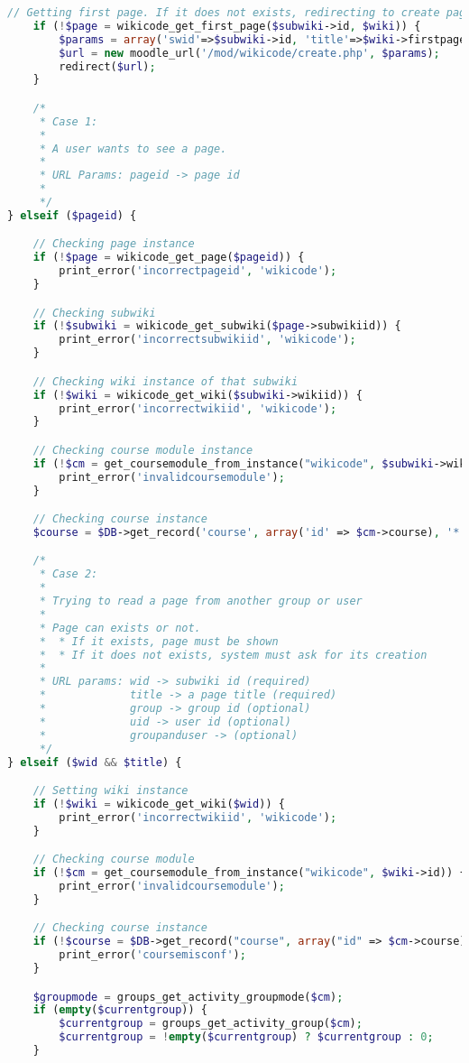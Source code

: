 \begin{lstlisting}[language=PHP]
    // Getting first page. If it does not exists, redirecting to create page
    if (!$page = wikicode_get_first_page($subwiki->id, $wiki)) {
        $params = array('swid'=>$subwiki->id, 'title'=>$wiki->firstpagetitle);
        $url = new moodle_url('/mod/wikicode/create.php', $params);
        redirect($url);
    }

    /*
     * Case 1:
     *
     * A user wants to see a page.
     *
     * URL Params: pageid -> page id
     *
     */
} elseif ($pageid) {

    // Checking page instance
    if (!$page = wikicode_get_page($pageid)) {
        print_error('incorrectpageid', 'wikicode');
    }

    // Checking subwiki
    if (!$subwiki = wikicode_get_subwiki($page->subwikiid)) {
        print_error('incorrectsubwikiid', 'wikicode');
    }

    // Checking wiki instance of that subwiki
    if (!$wiki = wikicode_get_wiki($subwiki->wikiid)) {
        print_error('incorrectwikiid', 'wikicode');
    }

    // Checking course module instance
    if (!$cm = get_coursemodule_from_instance("wikicode", $subwiki->wikiid)) {
        print_error('invalidcoursemodule');
    }

    // Checking course instance
    $course = $DB->get_record('course', array('id' => $cm->course), '*', MUST_EXIST);

    /*
     * Case 2:
     *
     * Trying to read a page from another group or user
     *
     * Page can exists or not.
     *  * If it exists, page must be shown
     *  * If it does not exists, system must ask for its creation
     *
     * URL params: wid -> subwiki id (required)
     *             title -> a page title (required)
     *             group -> group id (optional)
     *             uid -> user id (optional)
     *             groupanduser -> (optional)
     */
} elseif ($wid && $title) {

    // Setting wiki instance
    if (!$wiki = wikicode_get_wiki($wid)) {
        print_error('incorrectwikiid', 'wikicode');
    }

    // Checking course module
    if (!$cm = get_coursemodule_from_instance("wikicode", $wiki->id)) {
        print_error('invalidcoursemodule');
    }

    // Checking course instance
    if (!$course = $DB->get_record("course", array("id" => $cm->course))) {
        print_error('coursemisconf');
    }

    $groupmode = groups_get_activity_groupmode($cm);
    if (empty($currentgroup)) {
        $currentgroup = groups_get_activity_group($cm);
        $currentgroup = !empty($currentgroup) ? $currentgroup : 0;
    }


\end{lstlisting}
